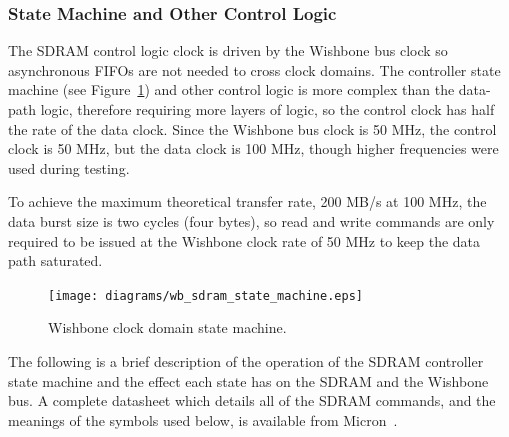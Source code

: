 \subsubsection{State Machine and Other Control Logic}
The SDRAM control logic clock is driven by the Wishbone bus clock so asynchronous
FIFOs are not needed to cross clock domains. The controller state machine (see
Figure~\ref{MEM_SDRAM_SM}) and other control logic is more complex than the
data-path logic, therefore requiring more layers of logic, so the control clock
has half the rate of the data clock. Since the Wishbone bus clock is 50 MHz, the
control clock is 50 MHz, but the data clock is 100 MHz, though higher frequencies
were used during testing.

To achieve the maximum theoretical transfer rate, 200 MB/s at 100 MHz, the data
burst size is two cycles (four bytes), so read and write commands are only
required to be issued at the Wishbone clock rate of 50 MHz to keep the data path
saturated.

\begin{figure}[h!]
\begin{center}
\texttt{[image: diagrams/wb\_sdram\_state\_machine.eps]}
\caption[Wishbone Clock Domain State Machine]{Wishbone clock domain state
machine.}
\end{center}
\label{MEM_SDRAM_SM}
\end{figure}

The following is a brief description of the operation of the SDRAM controller
state machine and the effect each state has on the SDRAM and the Wishbone bus. A
complete datasheet which details all of the SDRAM commands, and the meanings of
the symbols used below, is available from Micron~\cite{Micron_SDRAM_DS}.

